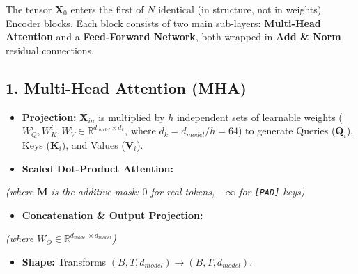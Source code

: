 \documentclass[11pt,a4paper,oneside]{report}
\providecommand{\tightlist}{\setlength{\itemsep}{0pt}\setlength{\parskip}{0pt}}
\begin{document}
The tensor \(\mathbf{X}_0\) enters the first of \(N\) identical (in structure, not in weights) Encoder blocks. Each block consists of two main sub-layers: \textbf{Multi-Head Attention} and a \textbf{Feed-Forward Network}, both wrapped in \textbf{Add \& Norm} residual connections.

\subsection{1. Multi-Head Attention (MHA)}\label{1-multi-head-attention-mha}

\begin{itemize}
\tightlist
\item
  \textbf{Projection:} \(\mathbf{X}_{in}\) is multiplied by \(h\) independent sets of learnable weights (\(W_Q^i, W_K^i, W_V^i \in \mathbb{R}^{d_{model} \times d_k}\), where \(d_k = d_{model} / h = 64\)) to generate Queries (\(\mathbf{Q}_i\)), Keys (\(\mathbf{K}_i\)), and Values (\(\mathbf{V}_i\)).
\item
  \textbf{Scaled Dot-Product Attention:}
\end{itemize}

\begin{center}\end{center}

\emph{(where \(\mathbf{M}\) is the additive mask: \(0\) for real tokens, \(-\infty\) for \texttt{{[}PAD{]}} keys)}

\begin{itemize}
\tightlist
\item
  \textbf{Concatenation \& Output Projection:}
\end{itemize}

\begin{center}\end{center}

\emph{(where \(W_O \in \mathbb{R}^{d_{model} \times d_{model}}\))}

\begin{itemize}
\tightlist
\item
  \textbf{Shape:} Transforms \((B, T, d_{model}) \rightarrow (B, T, d_{model})\).
\end{itemize}
\end{document}
